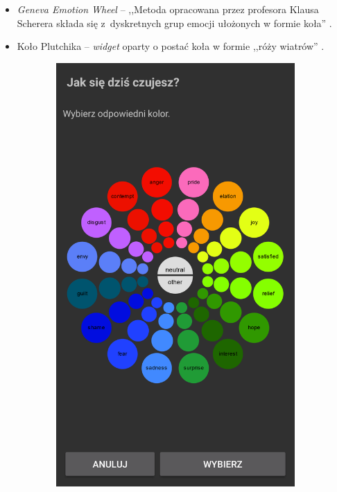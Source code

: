 \begin{itemize}
	\begin{itemize}
		\item \textit{Geneva Emotion Wheel} -- ,,Metoda opracowana przez profesora Klausa Scherera składa się z~dyskretnych grup emocji ułożonych w formie koła'' \cite{ArkadiuszLis}.
		
		\item Koło Plutchika -- \textit{widget} oparty o postać koła w formie ,,róży wiatrów'' \cite{ArkadiuszLis}.
	\end{itemize}
	
	\begin{figure}[H]
		\centering
		\begin{subfigure}{0.35\textwidth}
			\centering
			\includegraphics[scale=0.22]{rozdzial6/jspsych-geneva-wheel.png}

\end{subfigure}
\end{figure}
\end{itemize}
